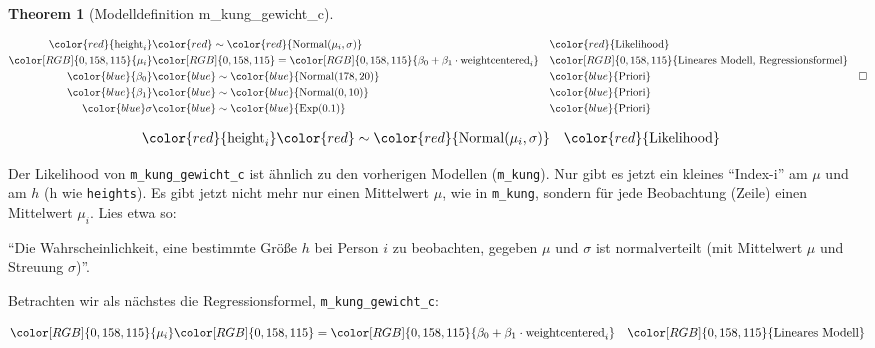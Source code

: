 \documentclass[
  ngerman,
  letterpaper,
  twoside,
  open=any]{scrbook}
\theoremstyle{definition}
\theoremstyle{plain}
\newtheorem{theorem}{Theorem}[chapter]
\theoremstyle{definition}
\theoremstyle{definition}
\theoremstyle{definition}
\theoremstyle{definition}
\theoremstyle{remark}
\begin{document}
\begin{theorem}[Modelldefinition
m\_kung\_gewicht\_c]\protect\hypertarget{thm-modm42}{}\label{thm-modm42}

\[
\begin{aligned}
\color{red}{\text{height}_i} & \color{red}\sim \color{red}{\operatorname{Normal}(\mu_i, \sigma)} && \color{red}{\text{Likelihood}} \\
\color[RGB]{0,158,115}{\mu_i} & \color[RGB]{0,158,115}= \color[RGB]{0,158,115}{\beta_0 + \beta_1\cdot \text{weightcentered}_i}  && \color[RGB]{0,158,115}{\text{Lineares Modell, Regressionsformel} } \\
\color{blue}{\beta_0} & \color{blue}\sim \color{blue}{\operatorname{Normal}(178, 20)} && \color{blue}{\text{Priori}} \\
\color{blue}{\beta_1}  & \color{blue}\sim \color{blue}{\operatorname{Normal}(0, 10)}  && \color{blue}{\text{Priori}}\\
\color{blue}\sigma & \color{blue}\sim \color{blue}{\operatorname{Exp}(0.1)}  && \color{blue}{\text{Priori}}
\end{aligned}\quad \square
\]

\end{theorem}

\[
\begin{aligned}
\color{red}{\text{height}_i} & \color{red}\sim \color{red}{\operatorname{Normal}(\mu_i, \sigma)} && \color{red}{\text{Likelihood}}
\end{aligned}
\]

Der Likelihood von \texttt{m\_kung\_gewicht\_c} ist ähnlich zu den
vorherigen Modellen (\texttt{m\_kung}). Nur gibt es jetzt ein kleines
\enquote{Index-i} am \(\mu\) und am \(h\) (h wie \texttt{heights}). Es
gibt jetzt nicht mehr nur einen Mittelwert \(\mu\), wie in
\texttt{m\_kung}, sondern für jede Beobachtung (Zeile) einen Mittelwert
\(\mu_i\). Lies etwa so:

\begin{displayquote}
\enquote{Die Wahrscheinlichkeit, eine bestimmte Größe \(h\) bei Person
\(i\) zu beobachten, gegeben \(\mu\) und \(\sigma\) ist normalverteilt
(mit Mittelwert \(\mu\) und Streuung \(\sigma\))}.
\end{displayquote}

Betrachten wir als nächstes die Regressionsformel,
\texttt{m\_kung\_gewicht\_c}:

\[
\begin{aligned}
\color[RGB]{0,158,115}{\mu_i} & \color[RGB]{0,158,115}= \color[RGB]{0,158,115}{\beta_0 + \beta_1\cdot \text{weightcentered}_i}  && \color[RGB]{0,158,115}{\text{Lineares Modell} } \\
\end{aligned}
\]
\end{document}
